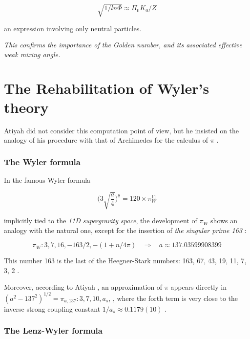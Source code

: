 \documentclass[a4paper,9pt]{article}
\begin{document}
\begin{equation}
\sqrt{1/ln\Phi} \approx \Pi_0 K_0/Z
\end{equation}

an expression involving only neutral particles.



\textit{This confirms the importance of the Golden number, and its associated effective weak mixing angle.}






\section{The Rehabilitation of Wyler's theory}

Atiyah did not consider this computation point of view, but he insisted on the analogy of his procedure with that of Archimedes for the calculus of $\pi$ \cite{Atiyah}.

\subsubsection {The Wyler formula}

In the famous Wyler formula \cite{Wyler} 

\begin{equation}
\bigg(3\sqrt{\frac{a}{4}} \bigg)^8 = 120 \times \pi_W^{11}
\end{equation}


implicitly tied to the \emph{11D supergravity space}, the development of  $\pi_W$ shows an analogy with the natural one, except for the insertion of \textit {the singular prime 163} :

\begin{equation}
\pi_W : 3, 7, 16,- 163/2, -(1+n/4\pi) ~~~~\Rightarrow ~~~~    a \approx 137.03599908399
\end{equation}


This number 163 is the last of the Heegner-Stark numbers: 163, 67, 43, 19, 11, 7, 3, 2 \cite{Stark}. 


Moreover, according to Atiyah \cite{Atiyah1}, an approximation of $\pi$ appears directly in $(a^2-137^2)^{1/2} = \pi_{a,137} : 3, 7, 10, a_s$, , where the forth term is very close to the inverse strong coupling constant $1/a_s \approx 0.1179(10)$ \cite{Tanabashi}. 




\subsubsection {The Lenz-Wyler formula}
\end{document}
